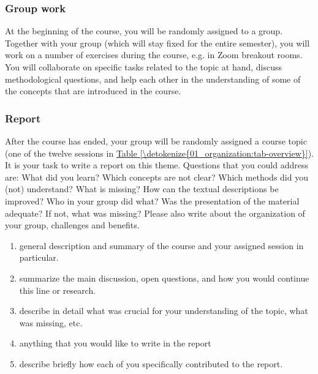 \documentclass[letterpaper,10pt,english]{sphinxmanual}
\begin{document}
\subsubsection*{Group work}

At the beginning of the course, you will be randomly assigned to a group.
Together with your group (which will stay fixed for the entire semester),
you will work on a number of exercises during the course, e.g. in Zoom breakout rooms.
You will collaborate on specific tasks related to the topic at hand, discuss methodological questions,
and help each other in the understanding of some of the concepts that are introduced in the course.
\subsubsection*{Report}

After the course has ended, your group will be randomly assigned a course topic (one of the twelve sessions in \hyperref[\detokenize{01_organization:tab-overview}]{Table \ref{\detokenize{01_organization:tab-overview}}}).
It is your task to write a report on this theme. Questions that you could address are:
What did you learn? Which concepts are not clear? Which methods did you (not) understand?
What is missing? How can the textual descriptions be improved? Who in your group did what?
Was the presentation of the material adequate? If not, what was missing?
Please also write about the organization of your group, challenges and benefits.

\begin{enumerate}
%
\item {} 
 general description and summary of the course and your assigned session in particular.

\item {} 
 summarize the main discussion, open questions, and how you would continue this line or research.

\item {} 
 describe in detail what was crucial for your understanding of the topic, what was missing, etc.

\item {} 
 anything that you would like to write in the report

\item {} 
 describe briefly how each of you specifically contributed to the report.

\end{enumerate}
\end{document}

